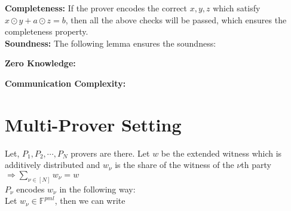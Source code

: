 \textbf{Completeness:} If the prover encodes the correct $x,y,z$ which satisfy $x\odot y + a\odot z=b$, then all the above checks will be passed, which ensures the completeness property.\\

\textbf{Soundness:} The following lemma ensures the soundness:

\begin{lemma}
		
\end{lemma}

\textbf{Zero Knowledge:}

\textbf{Communication Complexity:}
\section{Multi-Prover Setting}

Let, $P_1,P_2,\cdots,P_N$ provers are there. Let $w$ be the extended witness which is additively distributed and $w_{\nu}$ is the share of the witness of the $\nu$th party $\Rightarrow \sum\limits_{\nu \in [N]}w_{\nu}=w$\\
$P_{\nu}$ encodes $w_{\nu}$ in the following way:\\
Let $w_{\nu}\in \mathbb{F}^{pml}$, then we can write 


